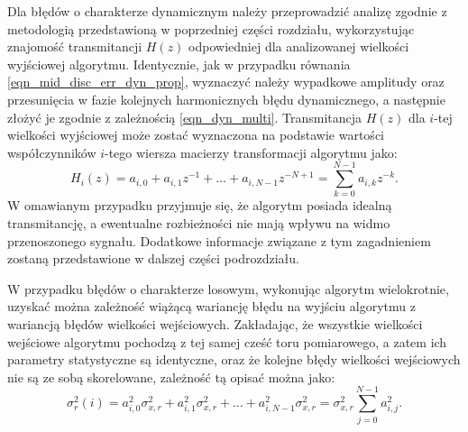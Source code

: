 Dla błędów o charakterze dynamicznym należy przeprowadzić analizę zgodnie z metodologią przedstawioną w poprzedniej części rozdziału, wykorzystując znajomość transmitancji $H(z)$ odpowiedniej dla analizowanej wielkości wyjściowej algorytmu. Identycznie, jak w przypadku równania \eqref{eqn_mid_disc_err_dyn_prop}, wyznaczyć należy wypadkowe amplitudy oraz przesunięcia w fazie kolejnych harmonicznych błędu dynamicznego, a następnie złożyć je zgodnie z zależnością \eqref{eqn_dyn_multi}. Transmitancja $H(z)$ dla $i$-tej wielkości wyjściowej może zostać wyznaczona na podstawie wartości współczynników $i$-tego wiersza macierzy transformacji algorytmu jako:
\begin{equation}
H_{i} \left( z \right) = a_{i, 0} + a_{i, 1} z^{-1} + \hdots + a_{i, N-1} z^{-N+1} = \sum _{k = 0} ^{N-1} a_{i, k} z^{-k} \label{eqn_alg_trans_single}.
\end{equation}
W omawianym przypadku przyjmuje się, że algorytm posiada idealną transmitancję, a ewentualne rozbieżności nie mają wpływu na widmo przenoszonego sygnału. Dodatkowe informacje związane z tym zagadnieniem zostaną przedstawione w dalszej części podrozdziału.

W przypadku błędów o charakterze losowym, wykonując algorytm wielokrotnie, uzyskać można zależność wiążącą wariancję błędu na wyjściu algorytmu z wariancją błędów wielkości wejściowych. Zakładając, że wszystkie wielkości wejściowe algorytmu pochodzą z tej samej cześć toru pomiarowego, a zatem ich parametry statystyczne są identyczne, oraz że kolejne błędy wielkości wejściowych nie są ze sobą skorelowane, zależność tą opisać można jako:
\begin{equation}
\sigma_{r}^{2} \left( i \right) = a_{i, 0}^{2} \sigma_{x,r}^{2} + a_{i, 1}^{2} \sigma_{x,r}^{2} + \hdots + a_{i, N-1}^{2} \sigma_{x,r}^{2} = \sigma_{x,r}^{2} \sum _{j=0} ^{N-1} {a_{i, j}^{2}} \label{eqn_alg_outvar_rand}.
\end{equation}

